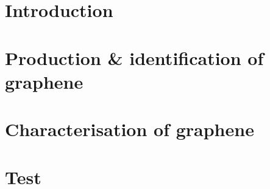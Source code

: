 \documentclass{report}
\begin{document}
	\newpage 
	\renewcommand{\baselinestretch}{0.94}\normalsize
	\tableofcontents
	\renewcommand{\baselinestretch}{1}\normalsize
	
	
	
	\chapter{Introduction}
	
	
	\chapter{Production \& identification of graphene}
%	
	
	\chapter{Characterisation of graphene}
	
	
	\chapter{Test}
	
	
	


\end{document}
